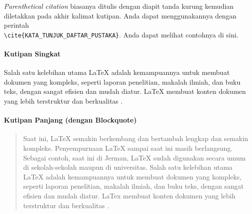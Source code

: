 \textit{Parenthetical citation} biasanya ditulis dengan diapit tanda kurung kemudian diletakkan pada akhir kalimat kutipan. Anda dapat menggunakannya dengan perintah \\ \verb|\cite{KATA_TUNJUK_DAFTAR_PUSTAKA}|. Anda dapat melihat contohnya di sini.

\paragraph{Kutipan Singkat}

Salah satu kelebihan utama LaTeX adalah kemampuannya untuk membuat dokumen yang kompleks, seperti laporan penelitian, makalah ilmiah, dan buku teks, dengan sangat efisien dan mudah diatur. LaTeX membuat konten dokumen yang lebih terstruktur dan berkualitas \cite{fitriani-2024:pelatihan-latex}.

\paragraph{Kutipan Panjang (dengan Blockquote)}

\begin{quote}
    Saat ini, LaTeX semakin berkembang dan bertambah lengkap dan semakin kompleks. Penyempurnaan LaTeX sampai saat ini masih berlangsung. Sebagai contoh, saat ini di Jerman, LaTeX sudah digunakan secara umum di sekolah-sekolah maupun di universitas. Salah satu kelebihan utama LaTeX adalah kemampuannya untuk membuat dokumen yang kompleks, seperti laporan penelitian, makalah ilmiah, dan buku teks, dengan sangat efisien dan mudah diatur. LaTex membuat konten dokumen yang lebih terstruktur dan berkualitas \cite{fitriani-2024:pelatihan-latex}.
\end{quote}

%    
%    
%    

